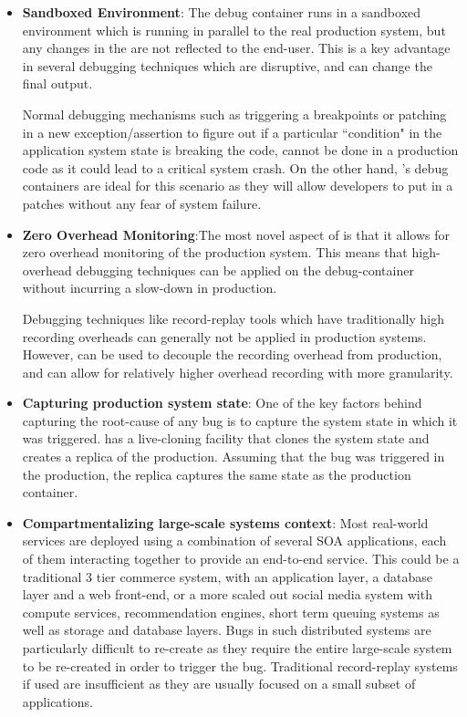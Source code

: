\begin{itemize}
	
	\item \textbf{Sandboxed Environment}: The debug container runs in a sandboxed environment which is running in parallel to the real production system, but any changes in the \debugcontainer are not reflected to the end-user. This is a key advantage in several debugging techniques which are disruptive, and can change the final output. 
	
	Normal debugging mechanisms such as triggering a breakpoints or patching in a new exception/assertion to figure out if a particular ``condition" in the application system state is breaking the code, cannot be done in a production code as it could lead to a critical system crash. On the other hand, \parikshan's debug containers are ideal for this scenario as they will allow developers to put in a patches without any fear of system failure.
	
	\item \textbf{Zero Overhead Monitoring}:The most novel aspect of \parikshan is that it allows for zero overhead monitoring of the production system. This means that high-overhead debugging techniques can be applied on the debug-container without incurring a slow-down in production.
	
	Debugging techniques like record-replay tools which have traditionally high recording overheads can generally not be applied in production systems. However, \parikshan can be used to decouple the recording overhead from production, and can allow for relatively higher overhead recording with more granularity.
	
	\item \textbf{Capturing production system state}:
	One of the key factors behind capturing the root-cause of any bug is to capture the system state in which it was triggered. \parikshan has a live-cloning facility that clones the system state and creates a replica of the production. Assuming that the bug was triggered in the production, the replica captures the same state as the production container.
	
	\item \textbf{Compartmentalizing large-scale systems context}:
	Most real-world services are deployed using a combination of several SOA applications, each of them interacting together to provide an end-to-end service. This could be a traditional 3 tier commerce system, with an application layer, a database layer and a web front-end, or a more scaled out social media system with compute services, recommendation engines, short term queuing systems as well as storage and database layers. 
	Bugs in such distributed systems are particularly difficult to re-create as they require the entire large-scale system to be re-created in order to trigger the bug. 
	Traditional record-replay systems if used are insufficient as they are usually focused on a small subset of applications.
	

\end{itemize}
